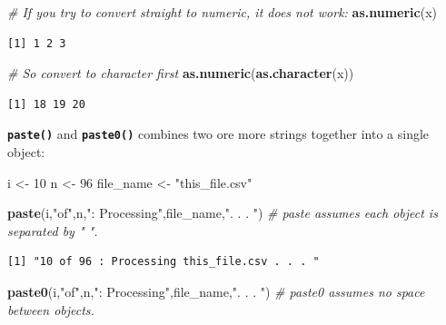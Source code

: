 \documentclass[
]{book}
\newenvironment{Shaded}{\begin{snugshade}}{\end{snugshade}}
\newcommand{\CommentTok}[1]{\textcolor[rgb]{0.56,0.35,0.01}{\textit{#1}}}
\newcommand{\DecValTok}[1]{\textcolor[rgb]{0.00,0.00,0.81}{#1}}
\newcommand{\KeywordTok}[1]{\textcolor[rgb]{0.13,0.29,0.53}{\textbf{#1}}}
\newcommand{\NormalTok}[1]{#1}
\newcommand{\StringTok}[1]{\textcolor[rgb]{0.31,0.60,0.02}{#1}}
\begin{document}
\begin{Shaded}
\begin{Highlighting}[]
\CommentTok{# If you try to convert straight to numeric, it does not work:}
\KeywordTok{as.numeric}\NormalTok{(x)}
\end{Highlighting}
\end{Shaded}

\begin{verbatim}
[1] 1 2 3
\end{verbatim}

\begin{Shaded}
\begin{Highlighting}[]
\CommentTok{# So convert to character first}
\KeywordTok{as.numeric}\NormalTok{(}\KeywordTok{as.character}\NormalTok{(x))}
\end{Highlighting}
\end{Shaded}

\begin{verbatim}
[1] 18 19 20
\end{verbatim}

\textbf{\texttt{paste()}} and \textbf{\texttt{paste0()}} combines two ore more strings together into a single object:

\begin{Shaded}
\begin{Highlighting}[]
\NormalTok{i <-}\StringTok{ }\DecValTok{10}
\NormalTok{n <-}\StringTok{ }\DecValTok{96}
\NormalTok{file_name <-}\StringTok{ "this_file.csv"}

\KeywordTok{paste}\NormalTok{(i,}\StringTok{"of"}\NormalTok{,n,}\StringTok{": Processing"}\NormalTok{,file_name,}\StringTok{". . . "}\NormalTok{) }\CommentTok{# paste assumes each object is separated by " ".}
\end{Highlighting}
\end{Shaded}

\begin{verbatim}
[1] "10 of 96 : Processing this_file.csv . . . "
\end{verbatim}

\begin{Shaded}
\begin{Highlighting}[]
\KeywordTok{paste0}\NormalTok{(i,}\StringTok{"of"}\NormalTok{,n,}\StringTok{": Processing"}\NormalTok{,file_name,}\StringTok{". . . "}\NormalTok{) }\CommentTok{# paste0 assumes no space between objects.}
\end{Highlighting}
\end{Shaded}
\end{document}
